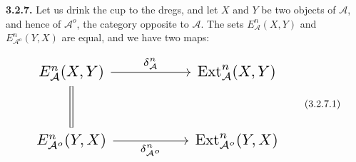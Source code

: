 \medskip\noindent\textbf{3.2.7.}\quad
Let us drink the cup to the dregs, and let $X$ and $Y$ be two objects of
$\mathcal A$, and hence of $\mathcal A^o$, the category opposite to
$\mathcal A$. The sets $E_{\mathcal A}^{n}(X,Y)$ and
$E_{\mathcal A^o}^{n}(Y,X)$ are equal, and we have two maps:

\begin{equation}
\resizebox{0.74\textwidth}{!}{%
$\begin{tikzcd}[ampersand replacement=\&,column sep=5.0em,row sep=2.8em]
E_{\mathcal A}^{n}(X,Y)
  \arrow[r,"{\delta_{\mathcal A}^{n}}"]
  \arrow[d,equal]
\& \operatorname{Ext}_{\mathcal A}^{n}(X,Y) \\
E_{\mathcal A^o}^{n}(Y,X)
  \arrow[r,"{\delta_{\mathcal A^o}^{n}}"']
\& \operatorname{Ext}_{\mathcal A^o}^{n}(Y,X)
\end{tikzcd}$%
}
\tag{3.2.7.1}
\end{equation}
\endgroup

